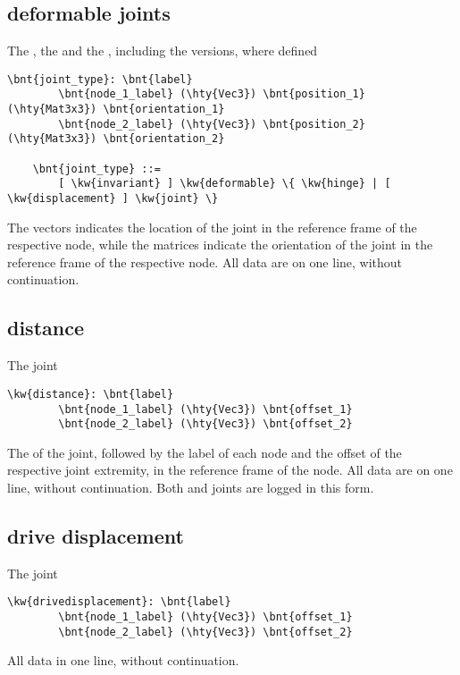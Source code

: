 \subsection{deformable joints}
The , the 
and the , including the 
versions, where defined
\begin{Verbatim}[commandchars=\\\{\}]
    \bnt{joint_type}: \bnt{label}
        \bnt{node_1_label} (\hty{Vec3}) \bnt{position_1} (\hty{Mat3x3}) \bnt{orientation_1}
        \bnt{node_2_label} (\hty{Vec3}) \bnt{position_2} (\hty{Mat3x3}) \bnt{orientation_2}

    \bnt{joint_type} ::=
        [ \kw{invariant} ] \kw{deformable} \{ \kw{hinge} | [ \kw{displacement} ] \kw{joint} \}
\end{Verbatim}
The  vectors indicates the location of the joint
in the reference frame of the respective node,
while the  matrices indicate the orientation of the joint
in the reference frame of the respective node.
All data are on one line, without continuation.

\subsection{distance}
The  joint
\begin{Verbatim}[commandchars=\\\{\}]
    \kw{distance}: \bnt{label}
        \bnt{node_1_label} (\hty{Vec3}) \bnt{offset_1}
        \bnt{node_2_label} (\hty{Vec3}) \bnt{offset_2}
\end{Verbatim}
The  of the joint, followed by the label of each node
and the offset of the respective joint extremity,
in the reference frame of the node.
All data are on one line, without continuation.
Both  and  joints are logged
in this form.

\subsection{drive displacement}
The  joint
\begin{Verbatim}[commandchars=\\\{\}]
    \kw{drivedisplacement}: \bnt{label}
        \bnt{node_1_label} (\hty{Vec3}) \bnt{offset_1}
        \bnt{node_2_label} (\hty{Vec3}) \bnt{offset_2}
\end{Verbatim}
All data in one line, without continuation.


